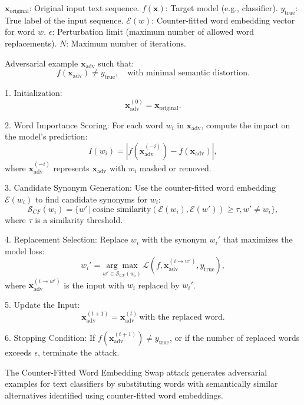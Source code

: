 
$\mathbf{x}_{\text{original}}$: Original input text sequence.  
$f(\mathbf{x})$: Target model (e.g., classifier).  
$y_{\text{true}}$: True label of the input sequence.  
$\mathcal{E}(w)$: Counter-fitted word embedding vector for word $w$.  
$\epsilon$: Perturbation limit (maximum number of allowed word replacements).  
$N$: Maximum number of iterations.

Adversarial example $\mathbf{x}_{\text{adv}}$ such that:  
\[
f(\mathbf{x}_{\text{adv}}) \neq y_{\text{true}}, \quad \text{with minimal semantic distortion}.
\]

1. Initialization:  
   \[
   \mathbf{x}_{\text{adv}}^{(0)} = \mathbf{x}_{\text{original}}.
   \]

2. Word Importance Scoring: For each word $w_i$ in $\mathbf{x}_{\text{adv}}$, compute the impact on the model's prediction:  
     \[
     I(w_i) = |f(\mathbf{x}_{\text{adv}}^{(-i)}) - f(\mathbf{x}_{\text{adv}})|,
     \]  
     where $\mathbf{x}_{\text{adv}}^{(-i)}$ represents $\mathbf{x}_{\text{adv}}$ with $w_i$ masked or removed.

3. Candidate Synonym Generation: Use the counter-fitted word embedding $\mathcal{E}(w_i)$ to find candidate synonyms for $w_i$:  
     \[
     \mathcal{S}_{CF}(w_i) = \{w' \,|\, \text{cosine similarity}(\mathcal{E}(w_i), \mathcal{E}(w')) \geq \tau, w' \neq w_i\},
     \]  
     where $\tau$ is a similarity threshold.

4. Replacement Selection: Replace $w_i$ with the synonym $w_i'$ that maximizes the model loss:  
     \[
     w_i' = \underset{w' \in \mathcal{S}_{CF}(w_i)}{\arg \max} \, \mathcal{L}(f, \mathbf{x}_{\text{adv}}^{(i \rightarrow w')}, y_{\text{true}}),
     \]  
     where $\mathbf{x}_{\text{adv}}^{(i \rightarrow w')}$ is the input with $w_i$ replaced by $w_i'$.

5. Update the Input:  
   \[
   \mathbf{x}_{\text{adv}}^{(t+1)} = \mathbf{x}_{\text{adv}}^{(t)} \, \text{with the replaced word}.
   \]

6. Stopping Condition: If $f(\mathbf{x}_{\text{adv}}^{(t+1)}) \neq y_{\text{true}}$, or if the number of replaced words exceeds $\epsilon$, terminate the attack.

The Counter-Fitted Word Embedding Swap attack generates adversarial examples for text classifiers by substituting words with semantically similar alternatives identified using counter-fitted word embeddings.

